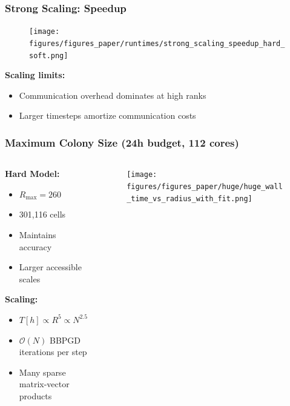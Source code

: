 \documentclass[10pt,t]{beamer}
\begin{document}
\begin{frame}
    \frametitle{Strong Scaling: Speedup}

    \begin{figure}
        \centering
        \texttt{[image: figures/figures\_paper/runtimes/strong\_scaling\_speedup\_hard\_soft.png]}
    \end{figure}

    \textbf{Scaling limits:}
    \begin{itemize}
        \item Communication overhead dominates at high ranks
        \item Larger timesteps amortize communication costs
    \end{itemize}

\end{frame}

\begin{frame}
    \frametitle{Maximum Colony Size (24h budget, 112 cores)}

    \begin{columns}
        \begin{column}{0.4\textwidth}
            \textbf{Hard Model:}
            \begin{itemize}
                \item $R_{\max} = 260$
                \item 301,116 cells
                \item Maintains accuracy
                \item Larger accessible scales
            \end{itemize}

            \vspace{0.5cm}

            \textbf{Scaling:}
            \begin{itemize}
                \item $T[h] \propto R^5 \propto N^{2.5}$
                \item $\mathcal{O}(N)$ BBPGD iterations per step
                \item Many sparse matrix-vector products
            \end{itemize}
        \end{column}

        \begin{column}{0.6\textwidth}
            \begin{figure}
                \centering
                \texttt{[image: figures/figures\_paper/huge/huge\_wall\_time\_vs\_radius\_with\_fit.png]}
            \end{figure}
        \end{column}

    \end{columns}

\end{frame}
\end{document}
